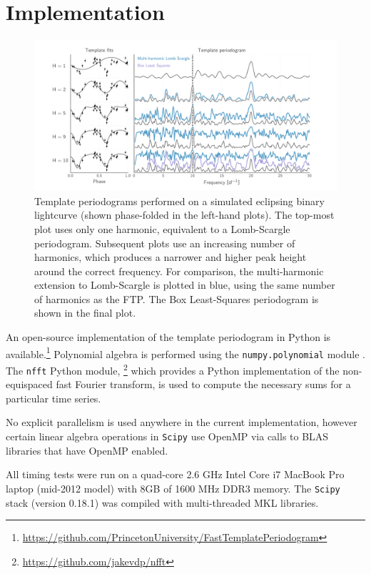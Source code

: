\documentclass{aastex62}
\begin{document}
\section{Implementation}\label{sec:implementation}

\begin{figure}
    \centering
    \includegraphics[width=\textwidth]{templates_and_periodograms.pdf}
    \caption{\label{fig:tempsandpdgs} Template periodograms performed on a simulated eclipsing
            binary lightcurve (shown phase-folded in the left-hand plots). The top-most plot
            uses only one harmonic, equivalent to a Lomb-Scargle periodogram. Subsequent plots
            use an increasing number of harmonics, which produces a narrower and higher peak
            height around the correct frequency. For comparison, the multi-harmonic extension
            to Lomb-Scargle is plotted in blue, using the same number of harmonics as the FTP.
            The Box Least-Squares \citep{Kovacs_2002} periodogram is shown in the final plot.}
\end{figure}

An open-source implementation of the template periodogram in Python is
available.\footnote{\url{https://github.com/PrincetonUniversity/FastTemplatePeriodogram}}
Polynomial algebra is performed using the \texttt{numpy.polynomial} module
\citep{Scipy}. The \texttt{nfft} Python module,
\footnote{\url{https://github.com/jakevdp/nfft}} which provides a Python
implementation of the non-equispaced fast Fourier transform,
is used to compute the necessary sums for a particular time series.

No explicit parallelism is used anywhere in the current implementation,
however certain linear algebra operations in \texttt{Scipy} use OpenMP
via calls to BLAS libraries that have OpenMP enabled.

All timing tests were run on a quad-core 2.6 GHz Intel Core i7 MacBook
Pro laptop (mid-2012 model) with 8GB of 1600 MHz DDR3 memory. The \texttt{Scipy} stack
(version 0.18.1) was compiled with multi-threaded MKL libraries.
\end{document}
